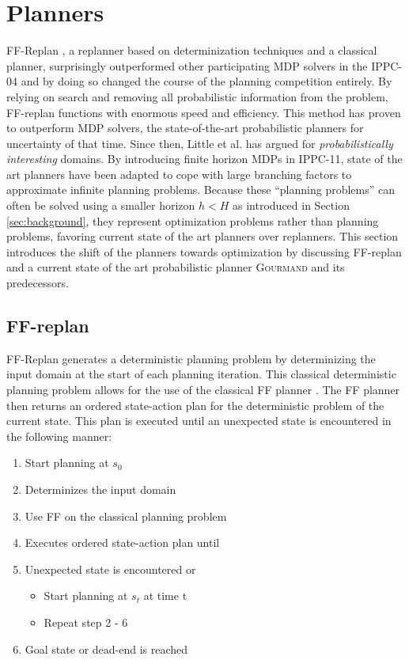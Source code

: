 \documentclass[runningheads,a4paper]{llncs}
\begin{document}

\section{Planners}
\label{sec:planners}

FF-Replan \cite{FFReplan}, a replanner based on determinization techniques and a classical planner, surprisingly outperformed other participating MDP solvers in the IPPC-04 and by doing so changed the course of the planning competition entirely. By relying on search and removing all probabilistic information from the problem, FF-replan functions with enormous speed and efficiency. This method has proven to outperform MDP solvers, the state-of-the-art probabilistic planners for uncertainty of that time. Since then, Little et al. has argued for \emph{probabilistically interesting} domains. By introducing finite horizon MDPs in IPPC-11, state of the art planners have been adapted to cope with large branching factors to approximate infinite planning problems. Because these ``planning problems'' can often be solved using a smaller horizon $h < H$ as introduced in Section \ref{sec:background}, they represent optimization problems rather than planning problems, favoring current state of the art planners over replanners. This section introduces the shift of the planners towards optimization  by discussing FF-replan and a current state of the art probabilistic planner \textsc{Gourmand} and its predecessors.

\subsection{FF-replan}
\label{sec:ffreplan}
 FF-Replan generates a deterministic planning problem by determinizing the input domain at the start of each planning iteration. This classical deterministic planning problem allows for the use of the classical FF planner \cite{Hoffmann01theff}. The FF planner then returns an ordered state-action plan for the deterministic problem of the current state. This plan is executed until an unexpected state is encountered in the following manner:

\begin{enumerate}
	\item Start planning at $s_0$
	\item Determinizes the input domain
	\item Use FF on the classical planning problem
	\item Executes ordered state-action plan until
	\item Unexpected state is encountered or
	\begin{itemize}
		\item Start planning at $s_t$ at time t
		\item Repeat step 2 - 6
	\end{itemize}
	\item Goal state or dead-end is reached
\end{enumerate}
\end{document}
